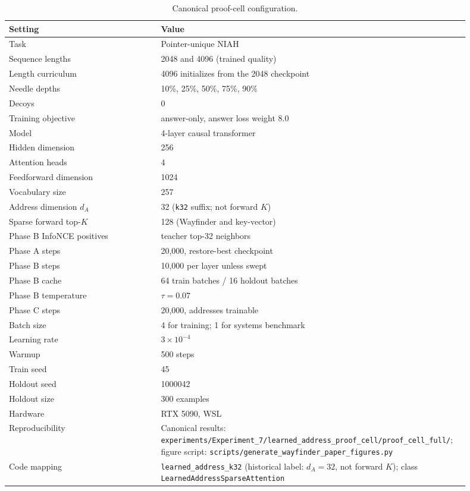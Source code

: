 \documentclass{article}
\begin{document}
\begin{table}[H]
\caption{Canonical proof-cell configuration.}
\centering
\small
\begin{tabular}{p{0.32\linewidth}p{0.58\linewidth}}
\toprule
Setting & Value \\
\midrule
Task & Pointer-unique NIAH \\
Sequence lengths & 2048 and 4096 (trained quality) \\
Length curriculum & 4096 initializes from the 2048 checkpoint \\
Needle depths & 10\%, 25\%, 50\%, 75\%, 90\% \\
Decoys & 0 \\
Training objective & answer-only, answer loss weight 8.0 \\
Model & 4-layer causal transformer \\
Hidden dimension & 256 \\
Attention heads & 4 \\
Feedforward dimension & 1024 \\
Vocabulary size & 257 \\
Address dimension $d_A$ & 32 (\texttt{k32} suffix; not forward $K$) \\
Sparse forward top-$K$ & 128 (Wayfinder and key-vector) \\
Phase B InfoNCE positives & teacher top-32 neighbors \\
Phase A steps & 20,000, restore-best checkpoint \\
Phase B steps & 10,000 per layer unless swept \\
Phase B cache & 64 train batches / 16 holdout batches \\
Phase B temperature & $\tau=0.07$ \\
Phase C steps & 20,000, addresses trainable \\
Batch size & 4 for training; 1 for systems benchmark \\
Learning rate & $3 \times 10^{-4}$ \\
Warmup & 500 steps \\
Train seed & 45 \\
Holdout seed & 1000042 \\
Holdout size & 300 examples \\
Hardware & RTX 5090, WSL \\
Reproducibility & Canonical results: \texttt{experiments/Experiment\_7/learned\_address\_proof\_cell/proof\_cell\_full/}; figure script: \texttt{scripts/generate\_wayfinder\_paper\_figures.py} \\
Code mapping & \texttt{learned\_address\_k32} (historical label: $d_A{=}32$, not forward $K$); class \texttt{LearnedAddressSparseAttention} \\
\bottomrule
\end{tabular}
\label{tab:setup}
\end{table}
\end{document}
